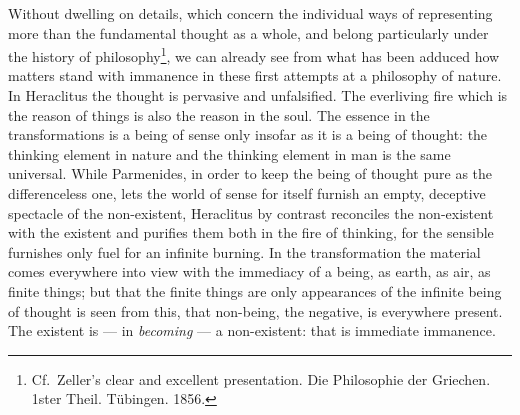 \documentclass[12pt,a4paper]{book}
\begin{document}
Without dwelling on details, which concern the individual ways of representing more than the fundamental thought
as a whole, and belong particularly under the history of philosophy\footnote{%
Cf.\ Zeller's clear and excellent presentation. Die Philosophie der Griechen. 1ster Theil. Tübingen. 1856.}, we
can already see from what has been adduced how matters stand with immanence in these first attempts at a
philosophy of nature. In Heraclitus the thought is pervasive and unfalsified. The everliving fire which is the
reason of things is also the reason in the soul. The essence in the transformations is a being of sense only
insofar as it is a being of thought: the thinking element in nature and the thinking element in man is the same
universal. While Parmenides, in order to keep the being of thought pure as the differenceless one, lets the world
of sense for itself furnish an empty, deceptive spectacle of the
non-existent, Heraclitus by contrast reconciles the non-existent with the existent and purifies them both in the
fire of thinking, for the sensible furnishes only fuel for an infinite burning. In the transformation the
material comes everywhere into view with the immediacy of a being, as earth, as air, as finite things; but that
the finite things are only appearances of the infinite being of thought is seen from this, that non-being, the
negative, is everywhere present. The existent is --- in \emph{becoming} --- a non-existent: that is immediate
immanence.
\end{document}
